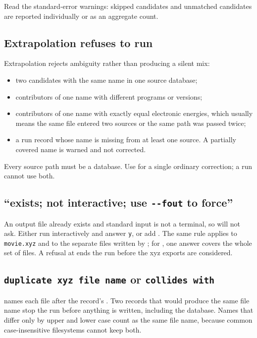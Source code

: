 Read the standard-error warnings: skipped candidates and unmatched candidates
are reported individually or as an aggregate count.

\subsection{Extrapolation refuses to run}

Extrapolation rejects ambiguity rather than producing a silent mix:

\begin{itemize}
  \item two candidates with the same name in one source database;
  \item contributors of one name with different programs or versions;
  \item contributors of one name with exactly equal electronic energies,
        which usually means the same file entered two sources or the same
        path was passed twice;
  \item a run record whose name is missing from at least one source. A
        partially covered name is warned and not corrected.
\end{itemize}

Every source path must be a database. Use  for a single
ordinary correction; a run cannot use both.

\subsection{``exists; not interactive; use \texttt{-{}-fout} to force''}

An output file already exists and standard input is not a terminal, so
\CJKQC{} will not ask. Either run interactively and answer \texttt{y}, or add
. The same rule applies to \texttt{movie.xyz} and to the separate
files written by ; for , one answer covers
the whole set of files. A refusal at  ends the run before the xyz
exports are considered.

\subsection{\texttt{duplicate xyz file name} or \texttt{collides with}}

 names each file after the record's . Two
records that would produce the same file name stop the run before anything
is written, including the  database. Names that differ only by
upper and lower case count as the same file name, because common
case-insensitive filesystems cannot keep both.

